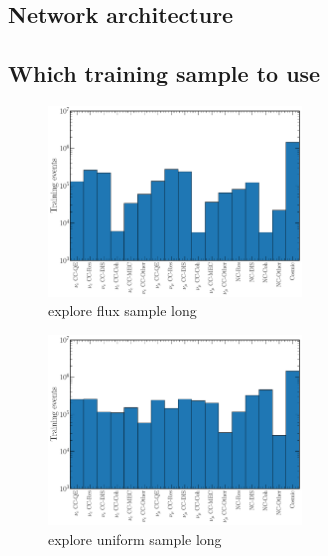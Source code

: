 \subsection{Network architecture} %
\label{sec:cvn_baseline_architecture} %

\subsection{Which training sample to use} %
\label{sec:cvn_baseline_sample} %

\begin{figure} %
    \includegraphics[width=0.6\textwidth]{diagrams/7-cvn/chipsnet/explore_flux_sample.pdf}
    \caption[explore flux sample short]
    {explore flux sample long}
    \label{fig:explore_flux_sample}
\end{figure}

\begin{figure} %
    \includegraphics[width=0.6\textwidth]{diagrams/7-cvn/chipsnet/explore_uniform_sample.pdf}
    \caption[explore uniform sample short]
    {explore uniform sample long}
    \label{fig:explore_uniform_sample}
\end{figure}

